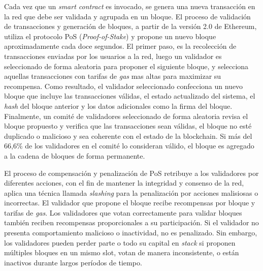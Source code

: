 Cada vez que un \textit{smart contract} es invocado, se genera una nueva transacción en la red que debe ser validada y agrupada en un bloque. El proceso de validación de transacciones y generación de bloques, a partir de la versión 2.0 de Ethereum, utiliza el protocolo PoS (\textit{Proof-of-Stake}) \citep{PoS} y propone un nuevo bloque aproximadamente cada doce segundos. El primer paso, es la recolección de transacciones enviadas por los usuarios a la red, luego un validador es seleccionado de forma aleatoria para proponer el siguiente bloque, y selecciona aquellas transacciones con tarifas de \textit{gas} mas altas para maximizar su recompensa. Como resultado, el validador seleccionado confecciona un nuevo bloque que incluye las transacciones válidas, el estado actualizado del sistema, el \textit{hash} del bloque anterior y los datos adicionales como la firma del bloque. Finalmente, un comité de validadores seleccionado de forma aleatoria revisa el bloque propuesto y verifica que las transacciones sean válidas, el bloque no esté duplicado o malicioso y sea coherente con el estado de la blockchain. Si más del 66,6\% de los validadores en el comité lo consideran válido, el bloque es agregado a la cadena de bloques de forma permanente.

El proceso de compensación y penalización de PoS retribuye a los validadores por diferentes acciones, con el fin de mantener la integridad y consenso de la red, aplica una técnica llamada \textit{slashing} para la penalización por acciones malisiosas o incorrectas. El validador que propone el bloque recibe recompensas por bloque y tarifas de \textit{gas}. Los validadores que votan correctamente para validar bloques también reciben recompensas proporcionales a su participación. Si el validador no presenta comportamiento malicioso o inactividad, no es penalizado. Sin embargo, los validadores pueden perder parte o todo su capital en \textit{stack} si proponen múltiples bloques en un mismo slot, votan de manera inconsistente, o están inactivos durante largos períodos de tiempo.


